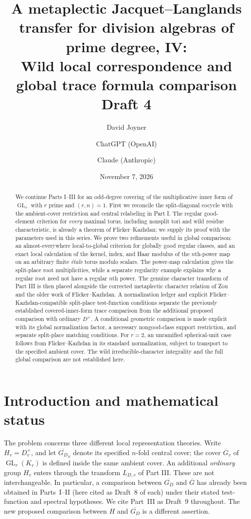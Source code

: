 \documentclass[11pt]{article}
\title{A metaplectic Jacquet--Langlands transfer for division algebras of prime degree, IV:\\
Wild local correspondence and global trace formula comparison\\[0.4em]\normalsize Draft 4}
\author{David Joyner \and ChatGPT (OpenAI) \and Claude (Anthropic)}
\date{November 7, 2026}
\newcommand{\GL}{\operatorname{GL}}
\newcommand{\Gb}{\overline G}
\newcommand{\GDb}{\overline{G_D}}
\theoremstyle{plain}
\theoremstyle{definition}
\begin{document}
\maketitle
\begin{abstract}
We continue Parts I--III for an odd-degree covering of the multiplicative
inner form of $\GL_r$ with $r$ prime and $(r,n)=1$.  First we reconcile the
split-diagonal cocycle with the ambient-cover restriction and central
relabeling in Part I.  The regular good-element criterion for \emph{every}
maximal torus, including nonsplit tori and wild residue characteristic,
is already a theorem of Flicker--Kazhdan; we supply its proof with the
parameters used in this series.  We prove two refinements useful in global
comparison: an almost-everywhere local-to-global criterion for globally
good regular classes, and an exact local calculation of the kernel, index,
and Haar modulus of the $n$th-power map on an arbitrary finite \emph{\'etale}
torus modulo scalars.  The power-map calculation gives the split-place
root multiplicities, while a separate regularity example explains why a
regular root need not have a regular $n$th power.  The genuine character transform of Part III
is then placed alongside the corrected metaplectic character relation of
Zou and the older work of Flicker--Kazhdan.  A normalization ledger and explicit Flicker--Kazhdan-compatible
split-place test-function conditions separate the previously established
covered-inner-form trace comparison from the additional proposed
comparison with ordinary $D^\times$.  A conditional geometric comparison is made explicit with its global
normalization factor, a necessary nongood-class support restriction,
and separate split-place matching conditions.  For $r=2$, an
unramified spherical-unit case follows from Flicker--Kazhdan in its
standard normalization, subject to transport to the specified ambient
cover. The wild irreducible-character integrality and the full global
comparison are not established here.
\end{abstract}
\tableofcontents

\section{Introduction and mathematical status}\label{sec:intro}
The problem concerns three different local representation theories.
Write $H_v=D_v^\times$, and let $\GDb_v$ denote its specified $n$-fold
central cover; the cover $\Gb_v$ of $\GL_r(K_v)$ is defined inside the
same ambient cover.  An additional \emph{ordinary} group $H_v$ enters
through the transform $L_{D,v}$ of Part III.  These are not interchangeable.
In particular, a comparison between $\GDb$ and $\Gb$ has already been
obtained in Parts~I--II (here cited as Draft~8 of each) under their
stated test-function and spectral hypotheses.  We cite Part~III
as Draft~9 throughout.  The new proposed comparison between $H$ and $\GDb$ is a
different assertion.
\end{document}
